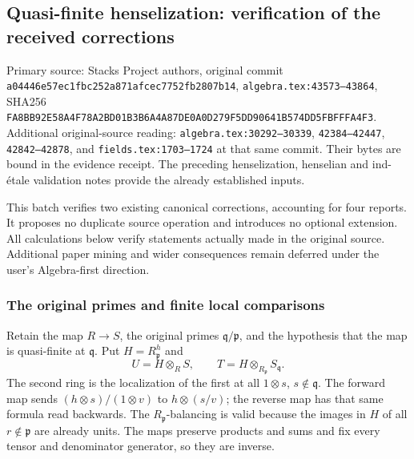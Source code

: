 \subsection{Quasi-finite henselization: verification of the received corrections}\label{algebra-proof-061-quasi-finite-henselization-verification-of-the-received-corrections}

Primary source: Stacks Project authors, original commit \texttt{a044\allowbreak{}46e5\allowbreak{}7ec1\allowbreak{}fbc2\allowbreak{}52a8\allowbreak{}71af\allowbreak{}cec7\allowbreak{}752f\allowbreak{}b280\allowbreak{}7b14}, \texttt{algebra.tex:43573–43864}, SHA256 \texttt{FA8B\allowbreak{}B92E\allowbreak{}58A4\allowbreak{}F78A\allowbreak{}2BD0\allowbreak{}1B3B\allowbreak{}6A4A\allowbreak{}87DE\allowbreak{}0A0D\allowbreak{}279F\allowbreak{}5DD9\allowbreak{}0641\allowbreak{}B574\allowbreak{}DD5F\allowbreak{}BFFF\allowbreak{}A4F3}. Additional original-source reading: \texttt{algebra.tex:30292–30339}, \texttt{42384–42447}, \texttt{42842–42878}, and \texttt{fields.tex:1703–1724} at that same commit. Their bytes are bound in the evidence receipt. The preceding henselization, henselian and ind-étale validation notes provide the already established inputs.

This batch verifies two existing canonical corrections, accounting for four reports. It proposes no duplicate source operation and introduces no optional extension. All calculations below verify statements actually made in the original source. Additional paper mining and wider consequences remain deferred under the user's Algebra-first direction.

\subsubsection{The original primes and finite local comparisons}\label{algebra-proof-061-the-original-primes-and-finite-local-comparisons}

Retain the map \(R\to S\), the original primes \(\mathfrak q/\mathfrak p\), and the hypothesis that the map is quasi-finite at \(\mathfrak q\). Put \(H=R_{\mathfrak p}^h\) and \[
 U=H\otimes_R S,\qquad
 T=H\otimes_{R_{\mathfrak p}}S_{\mathfrak q}.
\] The second ring is the localization of the first at all \(1\otimes s\), \(s\notin\mathfrak q\). The forward map sends \((h\otimes s)/(1\otimes v)\) to \(h\otimes(s/v)\); the reverse map has that same formula read backwards. The \(R_{\mathfrak p}\)-balancing is valid because the images in \(H\) of all \(r\notin\mathfrak p\) are already units. The maps preserve products and sums and fix every tensor and denominator generator, so they are inverse.

